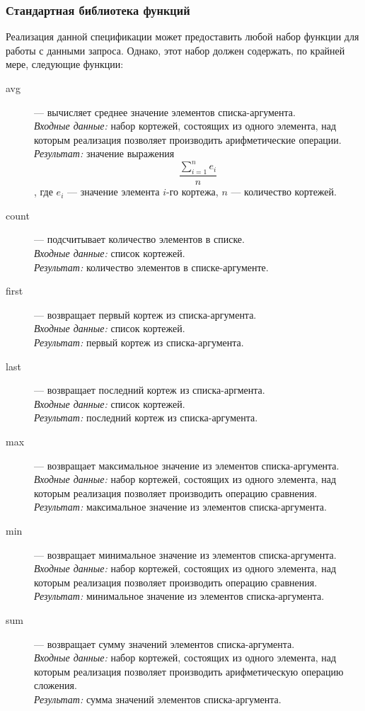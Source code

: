 \subsubsection{Стандартная библиотека функций}\label{std-funcs}
Реализация данной спецификации может предоставить любой набор функции для работы с 
данными запроса. Однако, этот набор должен содержать, по крайней мере, следующие
функции:
\begin{description}
    \item [avg] --- вычисляет среднее значение элементов списка-аргумента.\\
	{\it Входные данные:} набор кортежей, состоящих из одного элемента, над которым
			    реализация позволяет производить арифметические операции.\\
	{\it Результат:} значение выражения $$\frac{\sum_{i=1}^n e_i}{n}$$, 
		    где $e_i$ --- значение элемента $i$-го кортежа, 
		    $n$ --- количество кортежей.
    \item [count] --- подсчитывает количество элементов в списке.\\
	{\it Входные данные:} список кортежей.\\
	{\it Результат:} количество элементов в списке-аргументе.
    \item [first] --- возвращает первый кортеж из списка-аргумента.\\
	{\it Входные данные:} список кортежей.\\
	{\it Результат:} первый кортеж из списка-аргумента.
    \item [last] --- возвращает последний кортеж из списка-аргмента.\\
	{\it Входные данные:} список кортежей.\\
	{\it Результат:} последний кортеж из списка-аргумента.
    \item [max] --- возвращает максимальное значение из элементов списка-аргумента.\\
	{\it Входные данные:} набор кортежей, состоящих из одного элемента, над которым
			    реализация позволяет производить операцию сравнения.\\
	{\it Результат:} максимальное значение из элементов списка-аргумента.
    \item [min] --- возвращает минимальное значение из элементов списка-аргумента.\\
	{\it Входные данные:} набор кортежей, состоящих из одного элемента, над которым
			    реализация позволяет производить операцию сравнения.\\
	{\it Результат:} минимальное значение из элементов списка-аргумента.
    \item [sum] --- возвращает сумму значений элементов списка-аргумента.\\
	{\it Входные данные:} набор кортежей, состоящих из одного элемента, над которым
			    реализация позволяет производить арифметическую операцию сложения.\\
	{\it Результат:} сумма значений элементов списка-аргумента.
\end{description}
